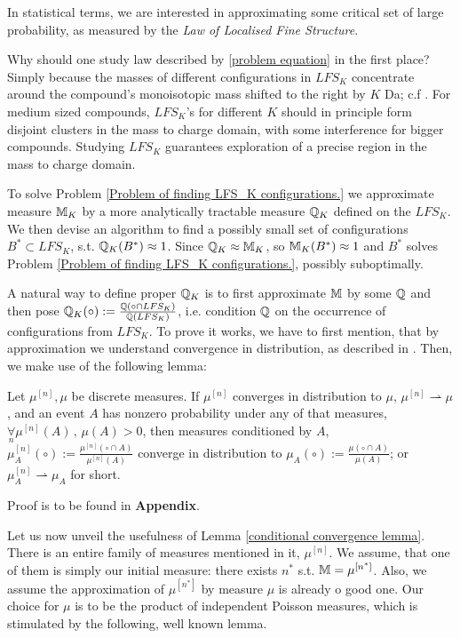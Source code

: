 In statistical terms, we are interested in approximating some critical set of large probability, as measured by the {\it Law of Localised Fine Structure}. 


Why should one study law described by \eqref{problem equation} in the first place? Simply because the masses of different configurations in $LFS_K$ concentrate around the compound's monoisotopic mass shifted to the right by $K$ Da; c.f \cite{Hughey2001KendrickMassDefect}. For medium sized compounds, $LFS_K$'s for different $K$ should in principle form disjoint clusters in the mass to charge domain, with some interference for bigger compounds. Studying $LFS_K$ guarantees exploration of a precise region in the mass to charge domain.


To solve Problem \ref{Problem of finding LFS_K configurations.} we approximate measure $\mathbb{M}_K$ by a more analytically tractable measure $\mathbb{Q}_K$ defined on the $LFS_K$. We then devise an algorithm to find a possibly small set of configurations $B^* \subset LFS_K$, s.t. $\mathbb{Q}_K (B^*) \approx 1$. Since $\mathbb{Q}_K \approx \mathbb{M}_K$, so $\mathbb{M}_K (B^*) \approx 1$ and $B^*$ solves Problem \ref{Problem of finding LFS_K configurations.}, possibly suboptimally.


A natural way to define proper $\mathbb{Q}_K$ is to first approximate $\mathbb{M}$ by some $\mathbb{Q}$ and then pose $\mathbb{Q}_K (\circ) := \frac{\mathbb{Q} (\circ \cap LFS_K) }{\mathbb{Q}(LFS_K)}$, i.e. condition $\mathbb{Q}$ on the occurrence of configurations from $LFS_K$. To prove it works, we have to first mention, that by approximation we understand convergence in distribution, as described in \cite{Kallenberg2002FoundationsOfModernProbability}. Then, we make use of the following lemma: 

\begin{lemma}\label{conditional convergence lemma}
	Let $\mu^{[n]}, \mu$ be discrete measures. If $\mu^{[n]}$ converges in distribution to $\mu$, $\mu^{[n]} \rightharpoonup  \mu$, and an event $A$ has nonzero probability under any of that measures, $\underset{n}{\forall} \mu^{[n]}(A)\,,\, \mu(A) > 0$, then measures conditioned by $A$, $\mu^{[n]}_A (\circ) := \frac{\mu^{[n]} ( \circ \cap A)}{\mu^{[n]}(A)}$ converge in distribution to $\mu_A (\circ) := \frac{ \mu( \circ \cap A) }{ \mu(A) }$; or $\mu^{[n]}_A \rightharpoonup \mu_A$ for short.
\end{lemma}  
Proof is to be found in \textbf{Appendix}.  


Let us now unveil the usefulness of Lemma \ref{conditional convergence lemma}. There is an entire family of measures mentioned in it, $\mu^{[n]}$. We assume, that one of them is simply our initial measure: there exists $n^*$ s.t. $\mathbb{M} = \mu^{[n^*]}$. Also, we assume the approximation of $\mu^{[n^*]}$ by measure $\mu$ is already o good one. Our choice for $\mu$ is to be the product of independent Poisson measures, which is stimulated by the following, well known lemma.


